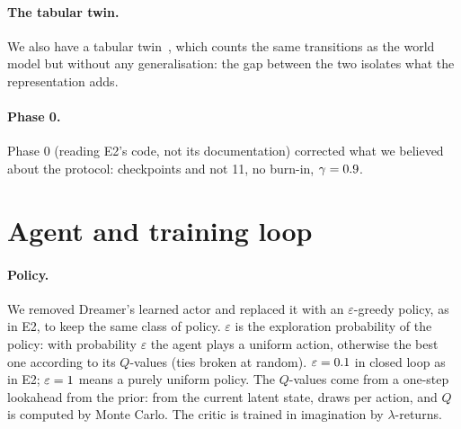 \documentclass[10pt]{article}
\begin{document}
\paragraph{The tabular twin.}
We also have a tabular twin~\twin, which counts the same transitions as the world model but without any generalisation:
the gap between the two isolates what the representation adds.

\paragraph{Phase 0.} %
Phase 0 (reading E2's code, not its documentation) corrected what we believed about the protocol: %
\eTwoNCheckpoints{} checkpoints and not 11, no burn-in, $\gamma = 0.9$. %

\section{Agent and training loop}
\label{sec:agent}

\paragraph{Policy.}
We removed Dreamer's learned actor and replaced it with an $\varepsilon$-greedy policy, as in E2, to keep the same class
of policy.
$\varepsilon$ is the exploration probability of the policy: with probability $\varepsilon$ the agent plays a uniform
action, otherwise the best one according to its $Q$-values (ties broken at random).
$\varepsilon = 0.1$ in closed loop as in E2; $\varepsilon = 1$ means a purely uniform
policy.
The $Q$-values come from a one-step lookahead from the prior: from the current latent state, \eThreeKAct{} draws per
action, and $Q$ is computed by Monte Carlo.
The critic is trained in imagination by $\lambda$-returns.
\end{document}
